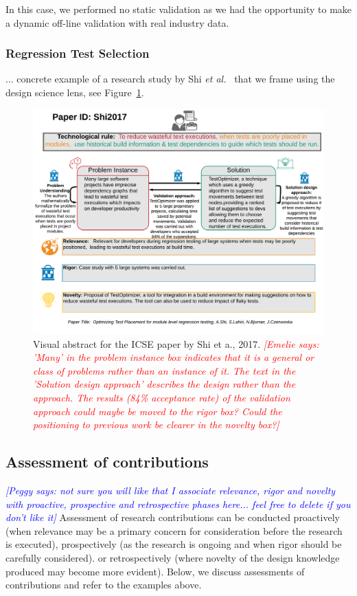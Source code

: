\documentclass[graybox]{svmult}
\newcommand{\emelie}[1]{\textcolor{red}{{\it [Emelie says: #1]}}}
\newcommand{\peggy}[1]{\textcolor{blue}{{\it [Peggy says: #1]}}}
\newcommand{\emelie}[1]{}
\newcommand{\peggy}[1]{}
\begin{document}
In this case, we performed no static validation as we had the opportunity to make a dynamic off-line validation with real industry data.


\subsubsection{Regression Test Selection}

... concrete example of a research study by Shi \emph{et al.}~\cite{Shi2017} that we frame using the design science lens, see Figure~\ref{fig:VA-example}. 
\begin{figure}
  \includegraphics[width=1.0\textwidth]{Figures/Shi2017.png}
\caption{Visual abstract for the ICSE paper by Shi et a., 2017. \emelie{'Many' in the problem instance box indicates that it is a general or class of problems rather than an instance of it. The text in the 'Solution design approach' describes the design rather than the approach. The results (84\% acceptance rate) of the validation approach could maybe be moved to the rigor box? Could the positioning to previous work be clearer in the novelty box?}}
\label{fig:VA-example}       %
\end{figure}


\subsection{Assessment of contributions}
\label{sec:assessment}

\peggy{not sure you will like that I associate relevance, rigor and novelty with proactive, prospective and retrospective phases here... feel free to delete if you don't like it}
Assessment of research contributions can be conducted proactively (when relevance may be a primary concern for consideration before the research is executed), prospectively (as the research is ongoing and when rigor should be carefully considered). or retrospectively (where novelty of the design knowledge produced may become more evident).
Below, we discuss assessments of contributions and refer to the examples above.
\end{document}
